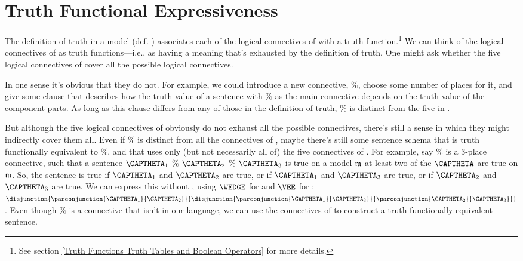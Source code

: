 \section[Truth Functional Expressiveness]{Truth Functional Expressiveness}\label{Truth Functional Expressiveness} 


The definition of truth in a model (def. ) associates each of the logical connectives of \GSL{} with a truth function.\footnote{See section \ref{Truth Functions Truth Tables and Boolean Operators} for more details.}
We can think of the logical connectives of \GSL{} as truth functions---i.e., as having a meaning that's exhausted by the definition of truth. 
One might ask whether the five logical connectives of \GSL{} cover all the possible logical connectives.

In one sense it's obvious that they do not. 
For example, we could introduce a new connective, $\%$, choose some number of places for it, and give some clause that describes how the truth value of a sentence with $\%$ as the main connective depends on the truth value of the component parts. 
As long as this clause differs from any of those in the definition of truth, $\%$ is distinct from the five in \GSL{}.

But although the five logical connectives of \GSL{} obviously do not exhaust all the possible connectives, there's still a sense in which they might indirectly cover them all. 
Even if $\%$ is distinct from all the connectives of \GSL{}, maybe there's still some sentence schema that is truth functionally equivalent to $\%$, and that uses only (but not necessarily all of) the five connectives of \GSL{}. 
For example, say $\%$ is a 3-place connective, such that a sentence $\CAPTHETA_1$ $\%$ $\CAPTHETA_2$ $\%$ $\CAPTHETA_3$ is true on a model $\mathfrak{m}$ \Iff at least two of the $\CAPTHETA$ are true on $\mathfrak{m}$.  So, the sentence is true if $\CAPTHETA_1$ and $\CAPTHETA_2$ are true, or if $\CAPTHETA_1$ and $\CAPTHETA_3$ are true, or if $\CAPTHETA_2$ and $\CAPTHETA_3$ are true.  We can express this without \mention{$\%$}, using $\WEDGE$ for  and $\VEE$ for :  $\disjunction{\parconjunction{\CAPTHETA_1}{\CAPTHETA_2}}{\disjunction{\parconjunction{\CAPTHETA_1}{\CAPTHETA_3}}{\parconjunction{\CAPTHETA_2}{\CAPTHETA_3}}}$.  Even though $\%$ is a connective that isn't in our language, we can use the connectives of \GSL{} to construct a truth functionally equivalent sentence. 


